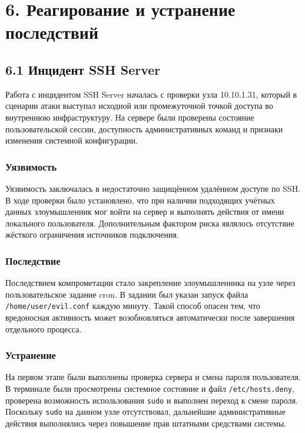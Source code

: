 \documentclass[14pt]{extarticle}
\begin{document}
\clearpage

\section*{6. Реагирование и устранение последствий}

\subsection*{6.1 Инцидент SSH Server}

Работа с инцидентом SSH Server началась с проверки узла 10.10.1.31, который в сценарии атаки выступал исходной или промежуточной точкой доступа во внутреннюю инфраструктуру. На сервере были проверены состояние пользовательской сессии, доступность административных команд и признаки изменения системной конфигурации.

\subsubsection*{Уязвимость}

Уязвимость заключалась в недостаточно защищённом удалённом доступе по SSH. В ходе проверки было установлено, что при наличии подходящих учётных данных злоумышленник мог войти на сервер и выполнять действия от имени локального пользователя. Дополнительным фактором риска являлось отсутствие жёсткого ограничения источников подключения.

\subsubsection*{Последствие}

Последствием компрометации стало закрепление злоумышленника на узле через пользовательское задание cron. В задании был указан запуск файла \texttt{/home/user/evil.conf} каждую минуту. Такой способ опасен тем, что вредоносная активность может возобновляться автоматически после завершения отдельного процесса.

\subsubsection*{Устранение}

На первом этапе были выполнены проверка сервера и смена пароля пользователя. В терминале были просмотрены системное состояние и файл \texttt{/etc/hosts.deny}, проверена возможность использования \texttt{sudo} и выполнен переход к смене пароля. Поскольку \texttt{sudo} на данном узле отсутствовал, дальнейшие административные действия выполнялись через повышение прав штатными средствами системы.
\end{document}
